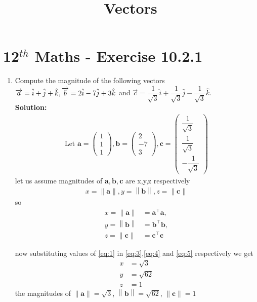 \documentclass[12pt]{article}
\providecommand{\norm}[1]{\left\lVert#1\right\rVert}
\newcommand{\solution}{\noindent \textbf{Solution: }}
\newcommand{\myvec}[1]{\ensuremath{\begin{pmatrix}#1\end{pmatrix}}}
\let\vec\mathbf
\begin{document}
\begin{center}
\title{\textbf{Vectors}}
\date{\vspace{-5ex}} %
\maketitle
\end{center}
\setcounter{page}{1}
\section*{12$^{th}$ Maths - Exercise 10.2.1}

\begin{enumerate}
\item Compute the magnitude of the following vectors 
$\\ \overrightarrow{a}=\hat{i}+\hat{j}+\hat{k},\overrightarrow{b}=2\hat{i}-7\hat{j}+3\hat{k}$ and $\overrightarrow{c}=\dfrac{1}{\sqrt{3}}\hat{i}+\dfrac{1}{\sqrt{3}}\hat{j}-\dfrac{1}{\sqrt{3}}\hat{k}$.\\
\solution
\begin{align}
\text{Let } \vec{a} = \myvec{1\\1\\1} , \vec{b} = \myvec{2\\ -7 \\ 3},\vec{c} = \myvec{\dfrac{1}{\sqrt{3}}\\ \dfrac{1}{\sqrt{3}} \\ -\dfrac{1}{\sqrt{3}}} 
\label{eq:1}
\end{align}
let us assume magnitudes of $\vec{a},\vec{b},\vec{c}$ are x,y,z respectively
\begin{align}
	x=\norm{\vec{a}} ,
	y=\norm{\vec{b}} ,
	z=\norm{\vec{c}}
	\label{eq:2}
\end{align}
so
\begin{align}
	x=\norm{\vec{a}}&={\vec{a}}^{\top}\vec{a}, 
	\label{eq:3}
	\\ y=\norm{\vec{b}}&={\vec{b}}^{\top}\vec{b}, 
	\label{eq:4}
	\\ z=\norm{\vec{c}}&={\vec{c}}^{\top}\vec{c}	
	\label{eq:5}
\end{align}

now substituting values of \eqref{eq:1} in \eqref{eq:3},\eqref{eq:4} and \eqref{eq:5} respectively we get
\begin{align}
	x&=\sqrt{3}
\\	y&=\sqrt{62}
\\	z&=1	
\end{align}
the magnitudes of $\norm{\vec{a}}=\sqrt{3}$, $\norm{\vec{b}}= \sqrt{62}$, $\norm{\vec{c}}=1$

\end{enumerate}
\end{document}
